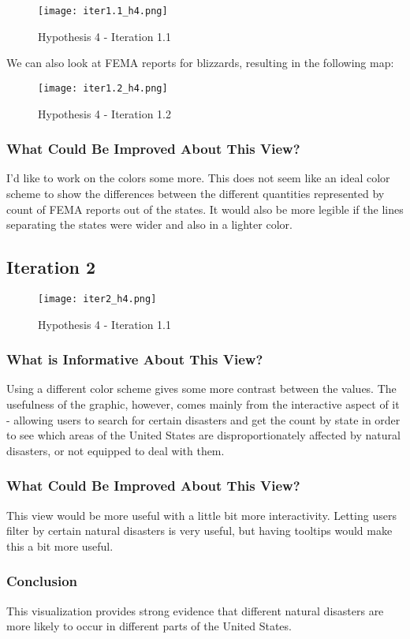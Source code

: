 \documentclass[11pt, letter]{article}
\begin{document}
 \begin{figure}[h]
    \centering
    \texttt{[image: iter1.1\_h4.png]}
    \caption{Hypothesis 4 - Iteration 1.1}
    \label{fig:my_label}
\end{figure}

We can also look at FEMA reports for blizzards, resulting in the following map:

 \begin{figure}[h]
    \centering
    \texttt{[image: iter1.2\_h4.png]}
    \caption{Hypothesis 4 - Iteration 1.2}
    \label{fig:my_label}
\end{figure}

\subsubsection*{What Could Be Improved About This View?}
 I’d like to work on the colors some more. This does not seem like an ideal color scheme to show the differences between the different quantities represented by count of FEMA reports out of the states. It would also be more legible if the lines separating the states were wider and also in a lighter color.
 
\subsection*{Iteration 2}
 
 \begin{figure}[h]
    \centering
    \texttt{[image: iter2\_h4.png]}
    \caption{Hypothesis 4 - Iteration 1.1}
    \label{fig:my_label}
\end{figure}

\subsubsection*{What is Informative About This View?}
Using a different color scheme gives some more contrast between the values. The usefulness of the graphic, however, comes mainly from the interactive aspect of it - allowing users to search for certain disasters and get the count by state in order to see which areas of the United States are disproportionately affected by natural disasters, or not equipped to deal with them.

\subsubsection*{What Could Be Improved About This View?}
 This view would be more useful with a little bit more interactivity. Letting users filter by certain natural disasters is very useful, but having tooltips would make this a bit more useful.

\subsubsection*{Conclusion}
This visualization provides strong evidence that different natural disasters are more likely to occur in different parts of the United States.
\end{document}
